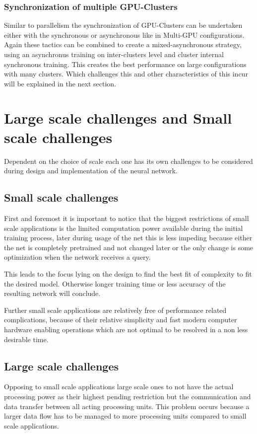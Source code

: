 \documentclass[conference]{IEEEtran}
\begin{document}
\subsubsection{Synchronization of multiple GPU-Clusters}
Similar to parallelism the synchronization of GPU-Clusters can be undertaken either with the synchronous or asynchronous like in Multi-GPU configurations. Again these tactics can be combined to create a mixed-asynchronous strategy, using an asynchronus training on inter-clusters level and cluster internal synchronous training\cite{sastre2017scalability}. This creates the best performance on large configurations with many clusters\cite{wang2016deep}. Which challenges this and other characteristics of this incur will be explained in the next section.



\section{Large scale challenges and Small scale challenges}
Dependent on the choice of scale each one has its own challenges to be considered during design and implementation of the neural network.

\subsection{Small scale challenges}
First and foremost it is important to notice that the biggest restrictions of small scale applications is the limited computation power available during the initial training process, later during usage of the net this is less impeding because either the net is completely pretrained and not changed later or the only change is some optimization when the network receives a query.

This leads to the focus lying on the design to find the best fit of complexity to fit the desired model. Otherwise longer training time or less accuracy of the resulting network will conclude.

Further small scale applications are relatively free of performance related complications, because of their relative simplicity and fast modern computer hardware enabling operations which are not optimal to be resolved in a non less desirable time.

\subsection{Large scale challenges}
Opposing to small scale applications large scale ones to not have the actual processing power as their highest pending restriction but the communication and data transfer between all acting processing units. This problem occurs because a larger data flow has to be managed to more processing units compared to small scale applications.
\end{document}
